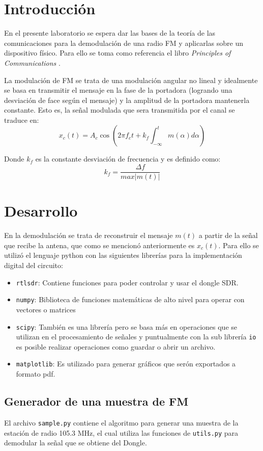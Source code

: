 \section{Introducción}
	En el presente laboratorio se espera dar las bases de la teoría de las comunicaciones para la demodulación de una radio FM y aplicarlas sobre un dispositivo físico.
Para ello se toma como referencia el libro \emph{Principles of Communications} \cite{PrinciplesofCommunications}.

La modulación de FM se trata de una modulación angular no lineal y idealmente se basa en transmitir el mensaje en la fase de la portadora (logrando una desviación de face según el mensaje) y la amplitud de la portadora mantenerla constante. Esto es, la señal modulada que sera transmitida por el canal se traduce en:
$$
	x_c (t) = A_c \cos \left( 2 \pi f_c t + k_f \int_{-\infty}^{t} m(\alpha) d\alpha \right)
$$

Donde $k_f$ es la constante desviación de frecuencia y es definido como:
$$
	k_f = \frac{\Delta f}{max|m(t)|}
$$


\section{Desarrollo}
En la demodulación se trata de reconstruir el mensaje $m(t)$ a partir de la señal que recibe la antena, que como se mencionó anteriormente es $x_c(t)$.
Para ello se utilizó el lenguaje python con las siguientes librerías para la implementación digital del circuito:
\begin{itemize}
	\item \texttt{rtlsdr}: Contiene funciones para poder controlar y usar el dongle SDR.
	\item \texttt{numpy}: Biblioteca de funciones matemáticas de alto nivel para operar con vectores o matrices
	\item \texttt{scipy}: También es una librería pero se basa más en operaciones que se utilizan en el procesamiento de señales y puntualmente con la sub librería \texttt{io} es posible realizar operaciones como guardar o abrir un archivo. 
	\item \texttt{matplotlib}: Es utilizado para generar gráficos que serón exportados a formato pdf. 
\end{itemize}

\subsection{Generador de una muestra de FM}
El archivo \texttt{sample.py} contiene el algoritmo para generar una muestra de la estación de radio 105.3 MHz, el cual utiliza las funciones de \texttt{utils.py} para demodular la señal que se obtiene del Dongle.


